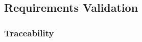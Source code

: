 \subsection{Requirements Validation}

\subsubsection{Traceability}

\cite{XLian:2017} 
\cite{Rashwan:2012}

